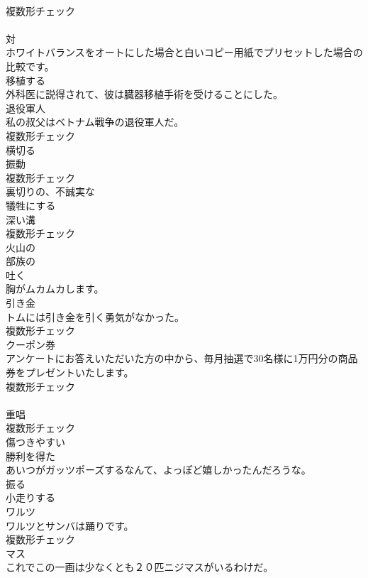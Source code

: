 \documentclass[8pt]{extreport}
\begin{document}
\begin{CJK}{UTF8}{min}
\\	複数形チェック
\\	[前置詞]	
\\	対	
\\	ホワイトバランスをオートにした場合と白いコピー用紙でプリセットした場合の比較です。	
\\	[動詞]	移植する	
\\	外科医に説得されて、彼は臓器移植手術を受けることにした。	
\\	[名詞]	退役軍人	
\\	私の叔父はベトナム戦争の退役軍人だ。	
\\	複数形チェック
\\	[動詞]	横切る	
\\	[名詞]	振動	
\\	複数形チェック
\\	[形容詞]	裏切りの、不誠実な	
\\	[動詞]	犠牲にする	
\\	[名詞]	深い溝	
\\	複数形チェック
\\	[形容詞]	火山の	
\\	[形容詞]	部族の	
\\	[動詞]	吐く	
\\	胸がムカムカします。	
\\	[名詞]	引き金	
\\	トムには引き金を引く勇気がなかった。	
\\	複数形チェック
\\	[名詞]	クーポン券	
\\	アンケートにお答えいただいた方の中から、毎月抽選で30名様に1万円分の商品券をプレゼントいたします。	
\\	複数形チェック
\\	[名詞]	
\\	重唱	
\\	複数形チェック
\\	[形容詞]	傷つきやすい	
\\	[形容詞]	勝利を得た	
\\	あいつがガッツポーズするなんて、よっぽど嬉しかったんだろうな。	
\\	[動詞]	振る	
\\	[動詞]	小走りする	
\\	[名詞]	ワルツ	
\\	ワルツとサンバは踊りです。	
\\	複数形チェック
\\	[名詞]	マス	
\\	これでこの一画は少なくとも２０匹ニジマスがいるわけだ。	

\end{CJK}
\end{document}
